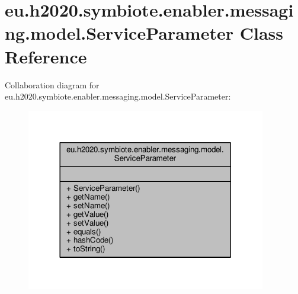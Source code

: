 \hypertarget{classeu_1_1h2020_1_1symbiote_1_1enabler_1_1messaging_1_1model_1_1ServiceParameter}{}\section{eu.\+h2020.\+symbiote.\+enabler.\+messaging.\+model.\+Service\+Parameter Class Reference}
\label{classeu_1_1h2020_1_1symbiote_1_1enabler_1_1messaging_1_1model_1_1ServiceParameter}


Collaboration diagram for eu.\+h2020.\+symbiote.\+enabler.\+messaging.\+model.\+Service\+Parameter\+:
\nopagebreak
\begin{figure}[H]
\begin{center}
\leavevmode
\includegraphics[width=296pt]{classeu_1_1h2020_1_1symbiote_1_1enabler_1_1messaging_1_1model_1_1ServiceParameter__coll__graph}
\end{center}
\end{figure}
